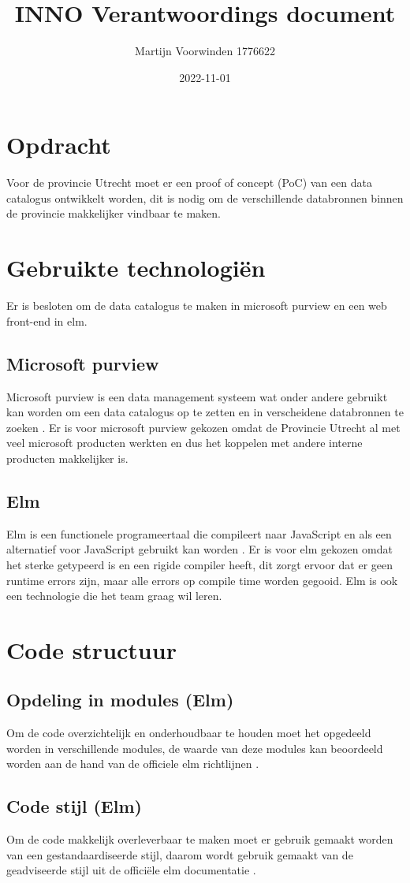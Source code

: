 \documentclass[12pt, a4paper]{report}
\title{INNO Verantwoordings document}
\author{Martijn Voorwinden  1776622}
\date{2022-11-01}
\begin{document}
    \maketitle
    \newpage
    \tableofcontents
    \chapter{Opdracht}
    Voor de provincie Utrecht moet er een proof of concept (PoC) van een data catalogus ontwikkelt worden,
    dit is nodig om de verschillende databronnen binnen de provincie makkelijker vindbaar te maken.

    \chapter{Gebruikte technologiën}
    Er is besloten om de data catalogus te maken in microsoft purview en een web front-end in elm.
    \section{Microsoft purview}
    Microsoft purview is een data management systeem wat onder andere gebruikt kan worden om een data catalogus op te zetten en in verscheidene databronnen te zoeken \cite{purview}.
    Er is voor microsoft purview gekozen omdat de Provincie Utrecht al met veel microsoft producten werkten en dus het koppelen met andere interne \\ producten makkelijker is.
    \section{Elm}
    Elm is een functionele programeertaal die compileert naar JavaScript en als een alternatief voor JavaScript gebruikt kan worden \cite{elm}.
    Er is voor elm gekozen omdat het sterke getypeerd is en een rigide compiler heeft,
    dit zorgt ervoor dat er geen runtime errors zijn, maar alle errors op compile time worden gegooid.
    Elm is ook een technologie die het team graag wil leren.

    \chapter{Code structuur}
    \section{Opdeling in modules (Elm)}
    Om de code overzichtelijk en onderhoudbaar te houden moet het opgedeeld worden in verschillende modules,
    de waarde van deze modules kan beoordeeld worden aan de hand van de officiele elm richtlijnen \cite{elm-modules}.
    \section{Code stijl (Elm)}
    Om de code makkelijk overleverbaar te maken moet er gebruik gemaakt worden van een gestandaardiseerde stijl,
    daarom wordt gebruik gemaakt van de geadviseerde stijl uit de officiële elm documentatie \cite{elm-style}.

    \newpage
    \nocite{*}
    \printbibliography
\end{document}
